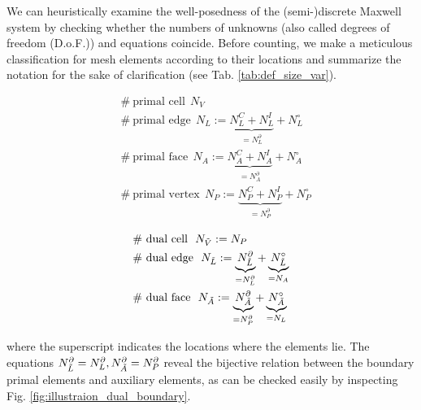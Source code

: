 \documentclass{article}
\begin{document}
We can heuristically examine the well-posedness of the (semi-)discrete Maxwell system by checking whether the numbers of unknowns (also called degrees of freedom (D.o.F.)) and equations coincide. Before counting, we make a meticulous classification for mesh elements according to their locations and summarize the notation for the sake of clarification (see Tab. \ref{tab:def_size_var}).
\begin{center}
\vspace{-0.5cm}
\begin{minipage}[t]{0.4\textwidth}
    \begin{align*}
        &\#\  \text{primal cell}\ \  N_V \\
        &\#\  \text{primal edge}\ \  N_L := \underbrace{N^C_L + N^I_L}_{=N^\partial_L} + N^\circ_L  \\
        &\#\  \text{primal face}\ \  N_A := \underbrace{N_A^C + N^I_A}_{=N^\partial_A} + N^\circ_A  \\
        &\#\  \text{primal vertex}\ \  N_P := \underbrace{N_P^C + N^I_P}_{=N^\partial_P} + N^\circ_P
    \end{align*}
\end{minipage}
\begin{minipage}[t]{0.4\textwidth}
    \begin{align*}
        &\#\  \text{dual cell}\ \  N_{\Tilde{V}} := N_P \\
        &\#\  \text{dual edge}\ \  N_{\Tilde{L}} := \underbrace{N^\partial_{\Tilde{L}}}_{=N^\partial_L} + \underbrace{N^\circ_{\Tilde{L}}}_{=N_A} \\
        &\#\  \text{dual face}\ \  N_{\Tilde{A}} := \underbrace{N^\partial_{\Tilde{A}}}_{=N^\partial_P} + \underbrace{N^\circ_{\Tilde{A}}}_{=N_L}
    \end{align*}
\end{minipage}   
\end{center}


where the superscript indicates the locations where the elements lie. The equations $N^\partial_{\Tilde{L}} = N^\partial_L, N^\partial_{\Tilde{A}} = N^\partial_P$ reveal the bijective relation between the boundary primal elements and auxiliary elements, as can be checked easily by inspecting Fig. \ref{fig:illustraion_dual_boundary}.
\end{document}
